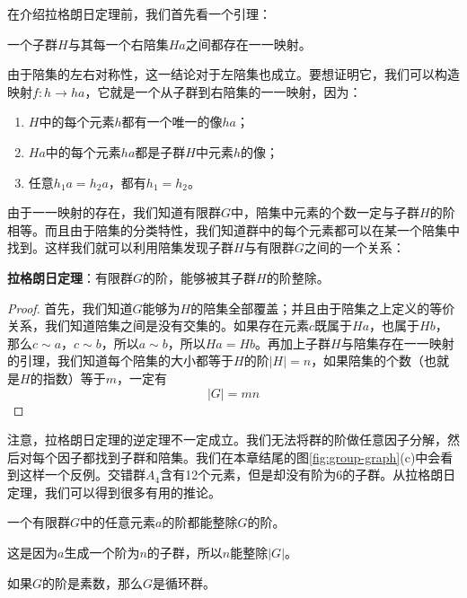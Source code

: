 \documentclass{article}
\begin{document}
在介绍拉格朗日定理前，我们首先看一个引理：

\begin{lemma}
一个子群$H$与其每一个右陪集$Ha$之间都存在一一映射。
\end{lemma}

由于陪集的左右对称性，这一结论对于左陪集也成立。要想证明它，我们可以构造映射$f: h \to ha$，它就是一个从子群到右陪集的一一映射，因为：

\begin{enumerate}
\item $H$中的每个元素$h$都有一个唯一的像$ha$；
\item $Ha$中的每个元素$ha$都是子群$H$中元素$h$的像；
\item 任意$h_1a = h_2a$，都有$h_1 = h_2$。
\end{enumerate}

由于一一映射的存在，我们知道有限群$G$中，陪集中元素的个数一定与子群$H$的阶相等。而且由于陪集的分类特性，我们知道群中的每个元素都可以在某一个陪集中找到。这样我们就可以利用陪集发现子群$H$与有限群$G$之间的一个关系：

\begin{theorem}
\textbf{拉格朗日定理}：有限群$G$的阶，能够被其子群$H$的阶整除。
\end{theorem}

\begin{proof}
首先，我们知道$G$能够为$H$的陪集全部覆盖；并且由于陪集之上定义的等价关系，我们知道陪集之间是没有交集的。如果存在元素$c$既属于$Ha$，也属于$Hb$，那么$c \sim a$，$c \sim b$，所以$a \sim b$，所以$Ha = Hb$。再加上子群$H$与陪集存在一一映射的引理，我们知道每个陪集的大小都等于$H$的阶$|H|=n$，如果陪集的个数（也就是$H$的指数）等于$m$，一定有
\[
|G| = mn
\]
\end{proof}

注意，拉格朗日定理的逆定理不一定成立。我们无法将群的阶做任意因子分解，然后对每个因子都找到子群和陪集。我们在本章结尾的图\ref{fig:group-graph}(c)中会看到这样一个反例。交错群$A_4$含有12个元素，但是却没有阶为6的子群。从拉格朗日定理，我们可以得到很多有用的推论。

\begin{corollary}
一个有限群$G$中的任意元素$a$的阶都能整除$G$的阶。
\end{corollary}

这是因为$a$生成一个阶为$n$的子群，所以$n$能整除$|G|$。

\begin{corollary}
如果$G$的阶是素数，那么$G$是循环群。
\end{corollary}
\end{document}
